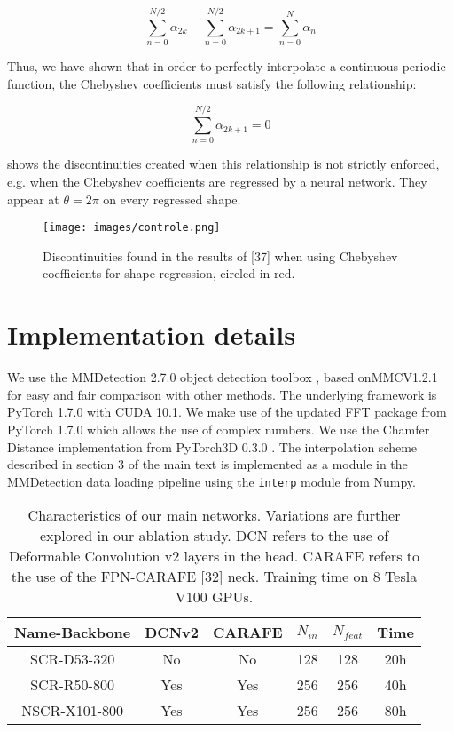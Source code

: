 \documentclass[10pt,twocolumn]{article}
\begin{document}
\begin{equation}
    \sum_{n=0}^{N/2} \alpha_{2k} - \sum_{n=0}^{N/2} \alpha_{2k+1} = \sum_{n=0}^{N} \alpha_{n} 
\end{equation}

Thus, we have shown that in order to perfectly interpolate
a continuous periodic function, the Chebyshev coefficients
must satisfy the following relationship:

\begin{equation}
    \sum_{n=0}^{N/2} \alpha_{2k+1} = 0
\end{equation}

 shows the discontinuities created when this relationship
is not strictly enforced, e.g. when the Chebyshev
coefficients are regressed by a neural network. They appear
at $\theta = 2 \pi$ on every regressed shape.

\begin{figure}[H]
    \centering
    \texttt{[image: images/controle.png]}
    \caption{Discontinuities found in the results of [37] when using
Chebyshev coefficients for shape regression, circled in red.}
    \label{fig:fig7}
\end{figure}


\section{Implementation details}

We use the MMDetection 2.7.0 object detection toolbox
\cite{chen2019mmdetection}, based onMMCV1.2.1 for easy and fair comparison
with other methods. The underlying framework is PyTorch
1.7.0 with CUDA 10.1. We make use of the updated FFT
package from PyTorch 1.7.0 which allows the use of complex
numbers. We use the Chamfer Distance implementation
from PyTorch3D 0.3.0 \cite{ravi2020accelerating}. The interpolation scheme
described in section 3 of the main text is implemented as a
module in the MMDetection data loading pipeline using the
\texttt{interp} module from Numpy.

\begin{table}[H]
    \centering
    \begin{tabular}{c|c|c|c|c|c}
         Name-Backbone & DCNv2 & CARAFE & $N_{in}$  & $N_{feat}$ & Time \\
         \hline
         SCR-D53-320 & No & No & 128 & 128 & 20h \\
         SCR-R50-800 & Yes & Yes & 256 & 256 & 40h \\
         NSCR-X101-800 &  Yes &  Yes &  256 &  256 & 80h \\
    \end{tabular}
    \caption{Characteristics of our main networks. Variations are further
explored in our ablation study. DCN refers to the use of Deformable
Convolution v2 \cite{zhu2019deformable} layers in the head. CARAFE refers
to the use of the FPN-CARAFE [32] neck. Training time on 8
Tesla V100 GPUs.}
    \label{tab:tabl}
\end{table}
\end{document}
